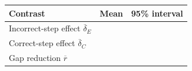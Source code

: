\begin{tabular}{lrr}\toprule
Contrast & Mean & 95\% interval\\\midrule
Incorrect-step effect $\overline{\delta}_E$ & \WrongMean{} & \WrongCI{} \\
Correct-step effect $\overline{\delta}_C$ & \CorrectMean{} & \CorrectCI{} \\
Gap reduction $\overline{r}$ & \ReductionMean{} & \ReductionCI{} \\
\bottomrule\end{tabular}
